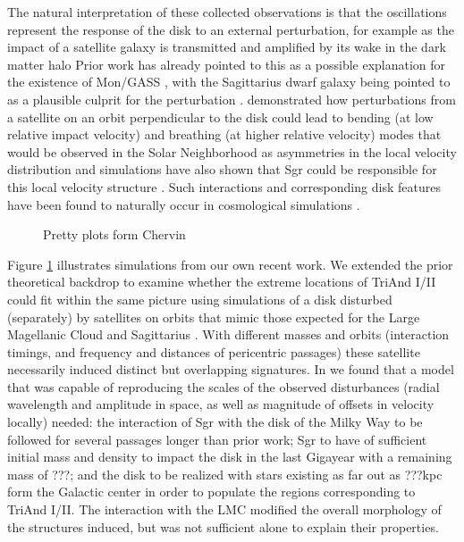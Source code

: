 \documentclass[galaxies,article,submit,moreauthors,pdftex,10pt,a4paper]{mdpi}
\begin{document}
The natural interpretation of these collected observations is that the oscillations represent the response of the disk to an external perturbation, for example as the impact of a satellite galaxy is transmitted and amplified by its wake in the dark matter halo \citep[as described for the LMC in][]{weinberg06}
Prior work has already pointed to this as a possible explanation for the existence of Mon/GASS \citep{katzantzidis08,younger08}, with the Sagittarius dwarf galaxy being pointed to as a plausible culprit for the perturbation \citep{purcell11}.
 \cite{widrow14} demonstrated how perturbations from a satellite on an orbit perpendicular to the disk could lead to bending (at low relative impact velocity) and breathing (at higher relative velocity) modes that would be observed in the Solar Neighborhood as asymmetries in the local velocity distribution and simulations have also shown that Sgr could be responsible for this local velocity structure  \cite{gomez13}.
Such interactions and corresponding disk features have been found to naturally occur in cosmological simulations \citep{gomez16}.

\begin{figure}[t]
\centering
\caption{\label{fig:chervin}
Pretty plots form Chervin}
\end{figure}

Figure \ref{fig:chervin} illustrates simulations from our own recent work.
We extended the prior theoretical backdrop to examine whether the extreme locations of TriAnd I/II could fit within the same picture using simulations of a disk disturbed (separately) by satellites on orbits that mimic those expected for the Large Magellanic Cloud and Sagittarius \citep{laporte17a}.
With different masses and orbits (interaction timings, and frequency and distances of pericentric passages) these satellite necessarily induced distinct but overlapping signatures.
In \cite{laporte17b} we found that a model that was capable of reproducing the scales of the observed disturbances (radial wavelength and  amplitude in space, as well as magnitude of offsets in velocity locally) needed:
the  interaction of Sgr with the disk of the Milky Way to be followed for several passages longer than prior work;
Sgr to have of sufficient initial mass and density to impact the disk in the last Gigayear with a remaining mass of ???;
and the disk to be realized with stars existing as far out as ???kpc form the Galactic center in order to populate the regions corresponding to TriAnd I/II.
The interaction with the LMC modified the overall morphology of the structures induced, but was not sufficient alone to explain their properties.
\end{document}
